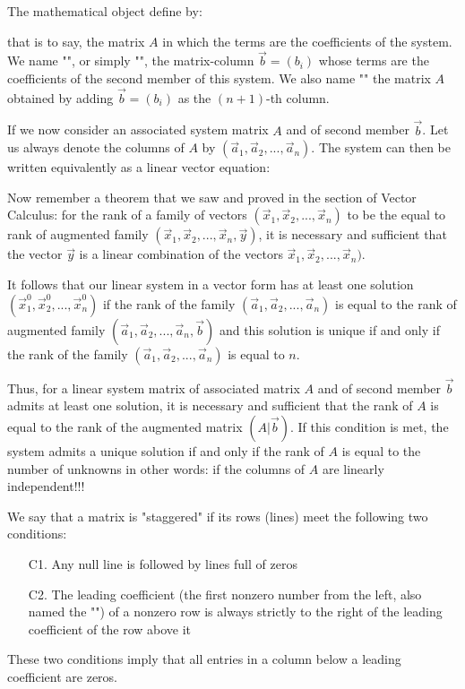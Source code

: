 	The mathematical object define by:
	
	that is to say, the matrix $A$ in which the terms are the coefficients of the system. We name "", or simply "", the matrix-column $\vec{b}=(b_i)$ whose terms are the coefficients of the second member of this system. We also name "" the matrix $A$ obtained by adding $\vec{b}=(b_i)$ as the $(n + 1)$-th column.
	
	If we now consider an associated  system matrix $A$ and of second member $\vec{b}$. Let us always denote the columns of $A$ by $(\vec{a}_1,\vec{a}_2,...,\vec{a}_n)$. The system can then be written equivalently as a linear vector equation:
	
	Now remember a theorem that we saw and proved in the section of Vector Calculus: for the rank of a family of vectors $(\vec{x}_1,\vec{x}_2,...,\vec{x}_n)$ to be the equal to rank of augmented family $(\vec{x}_1,\vec{x}_2,...,\vec{x}_n,\vec{y})$, it is necessary and sufficient that the vector $\vec{y}$ is a linear combination of the vectors $\vec{x}_1,\vec{x}_2,...,\vec{x}_n)$.
	
	It follows that our linear system in a vector form has at least one solution $(\vec{x}_1^0,\vec{x}_2^0,...,\vec{x}_n^0)$ if the rank of the family $(\vec{a}_1,\vec{a}_2,...,\vec{a}_n)$ is equal to the rank of augmented family $(\vec{a}_1,\vec{a}_2,...,\vec{a}_n,\vec{b})$ and this solution is unique if and only if the rank of the family $(\vec{a}_1,\vec{a}_2,...,\vec{a}_n)$ is equal to $n$.
	
	Thus, for a linear system matrix of associated matrix $A$ and of second member $\vec{b}$ admits at least one solution, it is necessary and sufficient that the rank of $A$ is equal to the rank of the augmented matrix $(A|\vec{b})$. If this condition is met, the system admits a unique solution if and only if the rank of $A$ is equal to the number of unknowns in other words: if the columns of $A$ are linearly independent!!!
	
	We say that a matrix is "staggered" if its rows (lines) meet the following two conditions:
	\begin{enumerate}
		\item[C1.] Any null line is followed by lines full of zeros
		
		\item[C2.] The leading coefficient (the first nonzero number from the left, also named the "") of a nonzero row is always strictly to the right of the leading coefficient of the row above it 
	\end{enumerate}
	These two conditions imply that all entries in a column below a leading coefficient are zeros.
	
